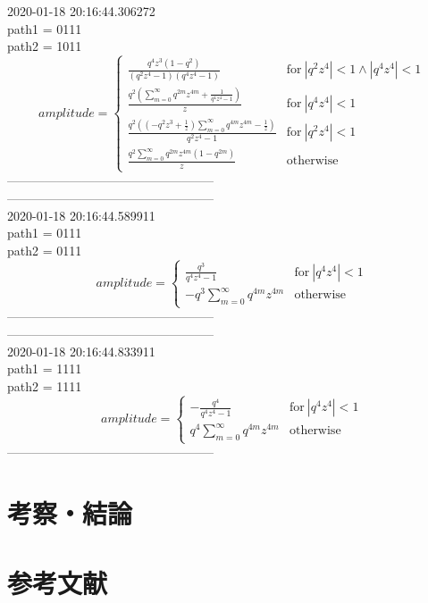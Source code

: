 \documentclass{jsreport}
\begin{document}
2020-01-18 20:16:44.306272\\
path1 = 0111\\
path2 = 1011\\
$$amplitude = \begin{cases} \frac{q^{4} z^{3} \left(1 - q^{2}\right)}{\left(q^{2} z^{4} - 1\right) \left(q^{4} z^{4} - 1\right)} & \text{for}\: \left|{q^{2} z^{4}}\right| < 1 \wedge \left|{q^{4} z^{4}}\right| < 1 \\\frac{q^{2} \left(\sum_{m=0}^{\infty} q^{2 m} z^{4 m} + \frac{1}{q^{4} z^{4} - 1}\right)}{z} & \text{for}\: \left|{q^{4} z^{4}}\right| < 1 \\\frac{q^{2} \left(\left(- q^{2} z^{3} + \frac{1}{z}\right) \sum_{m=0}^{\infty} q^{4 m} z^{4 m} - \frac{1}{z}\right)}{q^{2} z^{4} - 1} & \text{for}\: \left|{q^{2} z^{4}}\right| < 1 \\\frac{q^{2} \sum_{m=0}^{\infty} q^{2 m} z^{4 m} \left(1 - q^{2 m}\right)}{z} & \text{otherwise} \end{cases}$$
--------------------------------------------------\\
--------------------------------------------------\\
2020-01-18 20:16:44.589911\\
path1 = 0111\\
path2 = 0111\\
$$amplitude = \begin{cases} \frac{q^{3}}{q^{4} z^{4} - 1} & \text{for}\: \left|{q^{4} z^{4}}\right| < 1 \\- q^{3} \sum_{m=0}^{\infty} q^{4 m} z^{4 m} & \text{otherwise} \end{cases}$$
--------------------------------------------------\\
--------------------------------------------------\\
2020-01-18 20:16:44.833911\\
path1 = 1111\\
path2 = 1111\\
$$amplitude = \begin{cases} - \frac{q^{4}}{q^{4} z^{4} - 1} & \text{for}\: \left|{q^{4} z^{4}}\right| < 1 \\q^{4} \sum_{m=0}^{\infty} q^{4 m} z^{4 m} & \text{otherwise} \end{cases}$$
--------------------------------------------------\\

\section{考察・結論}
\section{参考文献}
\end{document}
